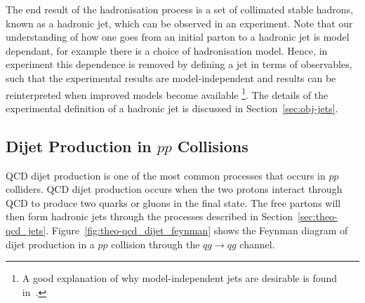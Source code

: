 The end result of the hadronisation process is a set of collimated stable hadrons,
known as a hadronic jet, which can be observed in an experiment.
Note that our understanding of how one goes from an initial parton to a hadronic jet is model dependant,
for example there is a choice of hadronisation model.
Hence, in experiment this dependence is removed by defining a jet in terms of observables,
such that the experimental results are model-independent and results can be reinterpreted when improved models become available
\footnote{A good explanation of why model-independent jets are desirable is found in~\cite{theo-jets_jb}.}.
The details of the experimental definition of a hadronic jet is discussed in Section~\ref{sec:obj-jets}.


\subsection{Dijet Production in $pp$ Collisions}
\label{sec:theo-qcd_dijet}

QCD dijet production is one of the most common processes that occurs in $pp$ colliders.
QCD dijet production occurs when the two protons interact through QCD to produce two quarks or gluons in the final state.
The free partons will then form hadronic jets through the processes described in Section~\ref{sec:theo-qcd_jets}.
Figure~\ref{fig:theo-qcd_dijet_feynman} shows the Feynman diagram of
dijet production in a $pp$ collision through the $qg \to qg$ channel.

